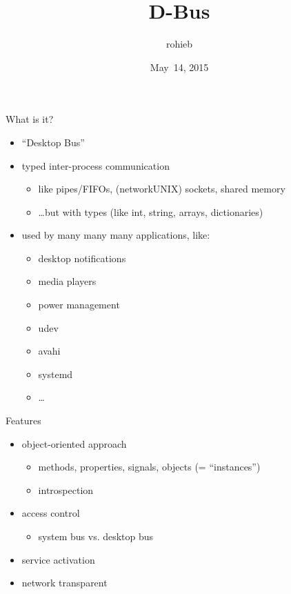 \documentclass{beamer}
\author{rohieb}
\title{D-Bus}
\institute{Stratum~0~e.\,V.}
\date{May~14, 2015}
\begin{document}
\begin{frame}[plain]
	\maketitle
\end{frame}

\begin{frame}{What is it?}
	\begin{itemize}
		\item ``Desktop Bus''
		\item typed inter-process communication
			\begin{itemize}
				\item like pipes/FIFOs, (network\textbar UNIX) sockets, shared memory
				\item \ldots but with types (like int, string, arrays, dictionaries)
			\end{itemize}
		\item used by many many many applications, like:
			\begin{itemize}
				\footnotesize
				\item desktop notifications
				\item media players
				\item power management
				\item udev
				\item avahi
				\item systemd
				\item \ldots
			\end{itemize}
	\end{itemize}
\end{frame}

\begin{frame}{Features}
\begin{itemize}
	\item object-oriented approach
		\begin{itemize}
			\item methods, properties, signals, objects (= ``instances'')
			\item introspection
		\end{itemize}
	\item access control
		\begin{itemize}
			\item system bus vs. desktop bus
		\end{itemize}
	\item service activation
	\item network transparent
\end{itemize}
\end{frame}
\end{document}
